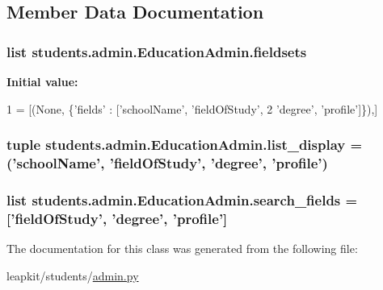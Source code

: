 \subsection{Member Data Documentation}
\hypertarget{classstudents_1_1admin_1_1_education_admin_a67e5ca4edffc907cb58002f86916faf4}{
\subsubsection[{fieldsets}]{\setlength{\rightskip}{0pt plus 5cm}list students.\-admin.\-Education\-Admin.\-fieldsets\hspace{0.3cm}{\ttfamily [static]}}}\label{classstudents_1_1admin_1_1_education_admin_a67e5ca4edffc907cb58002f86916faf4}
{\bfseries Initial value\-:}
\begin{DoxyCode}
1 = [(\textcolor{keywordtype}{None}, \{\textcolor{stringliteral}{'fields'} : [\textcolor{stringliteral}{'schoolName'}, \textcolor{stringliteral}{'fieldOfStudy'},
2         \textcolor{stringliteral}{'degree'}, \textcolor{stringliteral}{'profile'}]\}),]
\end{DoxyCode}
\hypertarget{classstudents_1_1admin_1_1_education_admin_a09f7b742c0a5a1e114576ae9529f8e51}{
\subsubsection[{list\-\_\-display}]{\setlength{\rightskip}{0pt plus 5cm}tuple students.\-admin.\-Education\-Admin.\-list\-\_\-display = ('school\-Name', 'field\-Of\-Study', 'degree', 'profile')\hspace{0.3cm}{\ttfamily [static]}}}\label{classstudents_1_1admin_1_1_education_admin_a09f7b742c0a5a1e114576ae9529f8e51}
\hypertarget{classstudents_1_1admin_1_1_education_admin_a7240de856d0b49bae16a0e65804dcefa}{
\subsubsection[{search\-\_\-fields}]{\setlength{\rightskip}{0pt plus 5cm}list students.\-admin.\-Education\-Admin.\-search\-\_\-fields = \mbox{[}'field\-Of\-Study', 'degree', 'profile'\mbox{]}\hspace{0.3cm}{\ttfamily [static]}}}\label{classstudents_1_1admin_1_1_education_admin_a7240de856d0b49bae16a0e65804dcefa}


The documentation for this class was generated from the following file\-:\begin{DoxyCompactItemize}
\item 
leapkit/students/\hyperlink{admin_8py}{admin.\-py}\end{DoxyCompactItemize}
